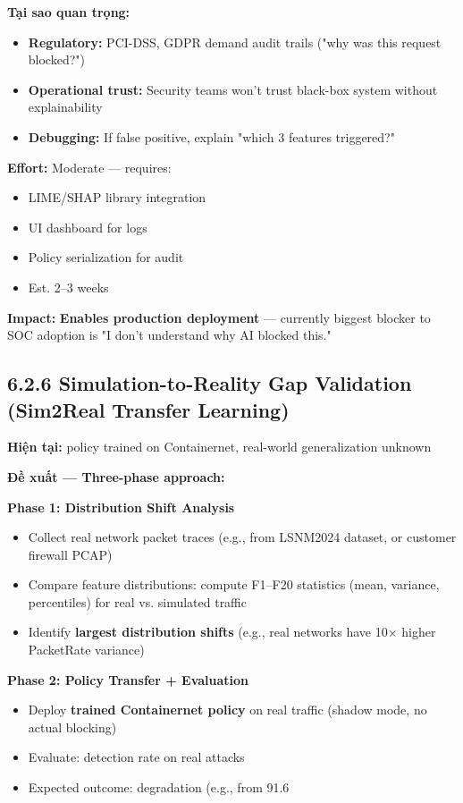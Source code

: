 \documentclass[12pt,a4paper,twoside]{report}
\begin{document}
{{{{{{{{{{{{{{\textbf{Tại sao quan trọng:}
\begin{itemize}
\item \textbf{Regulatory:} PCI-DSS, GDPR demand audit trails ("why was this request blocked?")
\item \textbf{Operational trust:} Security teams won't trust black-box system without explainability
\item \textbf{Debugging:} If false positive, explain "which 3 features triggered?"
\end{itemize}

\textbf{Effort:} Moderate — requires:
\begin{itemize}
\item LIME/SHAP library integration
\item UI dashboard for logs
\item Policy serialization for audit
\item Est. 2–3 weeks
\end{itemize}

\textbf{Impact:} \textbf{Enables production deployment} — currently biggest blocker to SOC adoption is "I don't understand why AI blocked this."


\subsection{6.2.6 Simulation-to-Reality Gap Validation (Sim2Real Transfer Learning)}

\textbf{Hiện tại:} policy trained on Containernet, real-world generalization unknown

\textbf{Đề xuất — Three-phase approach:}

\textbf{Phase 1: Distribution Shift Analysis}
\begin{itemize}
\item Collect real network packet traces (e.g., from LSNM2024 dataset, or customer firewall PCAP)
\item Compare feature distributions: compute F1–F20 statistics (mean, variance, percentiles) for real vs. simulated traffic
\item Identify \textbf{largest distribution shifts} (e.g., real networks have 10× higher PacketRate variance)
\end{itemize}

\textbf{Phase 2: Policy Transfer + Evaluation}
\begin{itemize}
\item Deploy \textbf{trained Containernet policy} on real traffic (shadow mode, no actual blocking)
\item Evaluate: detection rate on real attacks
\item Expected outcome: degradation (e.g., from 91.6%
\end{itemize}

}}}}}}}}}}}}}}
\end{document}
